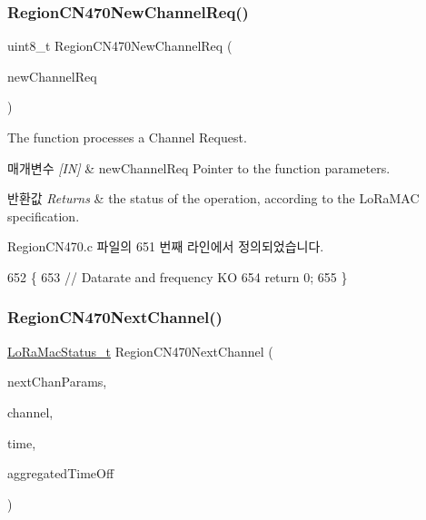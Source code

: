 \subsubsection{\texorpdfstring{Region\+C\+N470\+New\+Channel\+Req()}{RegionCN470NewChannelReq()}}
{\footnotesize\ttfamily uint8\+\_\+t Region\+C\+N470\+New\+Channel\+Req (\begin{DoxyParamCaption}\item[{\mbox{\hyperlink{group___r_e_g_i_o_n_gae2abcdb6dbb843c9faf5fd3009eca9d6}{New\+Channel\+Req\+Params\+\_\+t}} $\ast$}]{new\+Channel\+Req }\end{DoxyParamCaption})}



The function processes a Channel Request. 


\begin{DoxyParams}{매개변수}
{\em \mbox{[}\+I\+N\mbox{]}} & new\+Channel\+Req Pointer to the function parameters.\\
\hline
\end{DoxyParams}

\begin{DoxyRetVals}{반환값}
{\em Returns} & the status of the operation, according to the Lo\+Ra\+M\+AC specification. \\
\hline
\end{DoxyRetVals}


Region\+C\+N470.\+c 파일의 651 번째 라인에서 정의되었습니다.


\begin{DoxyCode}
652 \{
653     \textcolor{comment}{// Datarate and frequency KO}
654     \textcolor{keywordflow}{return} 0;
655 \}
\end{DoxyCode}
\mbox{\label{group___r_e_g_i_o_n_c_n470_ga462853ffc721358f0c574c2042a0d4fc}} 
\subsubsection{\texorpdfstring{Region\+C\+N470\+Next\+Channel()}{RegionCN470NextChannel()}}
{\footnotesize\ttfamily \mbox{\hyperlink{group___l_o_r_a_m_a_c_ga30bd25657e10480f8605ee951b0ecfbd}{Lo\+Ra\+Mac\+Status\+\_\+t}} Region\+C\+N470\+Next\+Channel (\begin{DoxyParamCaption}\item[{\mbox{\hyperlink{group___r_e_g_i_o_n_ga115f5e83afae352c0a3dcdc193374040}{Next\+Chan\+Params\+\_\+t}} $\ast$}]{next\+Chan\+Params,  }\item[{uint8\+\_\+t $\ast$}]{channel,  }\item[{\mbox{\hyperlink{utilities_8h_a4215ca43d3e953099ea758ce428599d0}{Timer\+Time\+\_\+t}} $\ast$}]{time,  }\item[{\mbox{\hyperlink{utilities_8h_a4215ca43d3e953099ea758ce428599d0}{Timer\+Time\+\_\+t}} $\ast$}]{aggregated\+Time\+Off }\end{DoxyParamCaption})}



